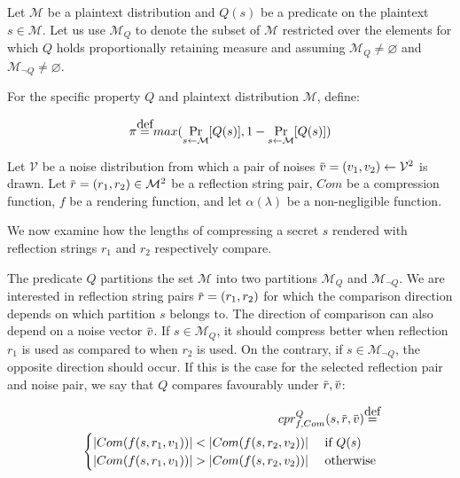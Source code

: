 \documentclass{sig-alternate-05-2015}
\let\emptyset\varnothing
\newcommand\defeq{\stackrel{\mathclap{\normalfont\mbox{def}}}{=}}
\newcommand{\overbar}[1]{\mkern 1.5mu\overline{\mkern-1.5mu#1\mkern-1.5mu}\mkern 1.5mu}
\begin{document}
Let $\mathcal{M}$ be a plaintext distribution and $Q(s)$ be a predicate on the
plaintext $s \in \mathcal{M}$. Let us use $\mathcal{M}_Q$ to denote the subset
of $\mathcal{M}$ restricted over the elements for which $Q$ holds
proportionally retaining measure and assuming $\mathcal{M}_Q \neq \emptyset$
and $\mathcal{M}_{\lnot Q} \neq \emptyset$.

For the specific property $Q$ and plaintext distribution $\mathcal{M}$, define:

\begin{equation*}
    \pi \defeq max(\Pr_{s \leftarrow \mathcal{M}}[Q(s)], 1 - \Pr_{s \leftarrow \mathcal{M}}[Q(s)])
\end{equation*}

Let $\mathcal{V}$ be a noise distribution from which a pair of noises
$\overbar{v} = (v_1, v_2) \leftarrow \mathcal{V}^2$ is drawn.  Let $\overbar{r}
= (r_1, r_2) \in \mathcal{M}^2$ be a reflection string pair, $Com$ be a
compression function, $f$ be a rendering function, and let $\alpha(\lambda)$ be
a non-negligible function.

We now examine how the lengths of compressing a secret $s$ rendered with
reflection strings $r_1$ and $r_2$ respectively compare.

The predicate $Q$ partitions the set $\mathcal{M}$ into two partitions
$\mathcal{M}_Q$ and $\mathcal{M}_{\lnot Q}$. We are interested in reflection
string pairs $\overbar{r} = (r_1, r_2)$ for which the comparison direction
depends on which partition $s$ belongs to.  The direction of comparison can
also depend on a noise vector $\overbar{v}$.  If $s \in \mathcal{M}_Q$, it
should compress better when reflection $r_1$ is used as compared to when $r_2$
is used. On the contrary, if $s \in \mathcal{M}_{\lnot Q}$, the opposite
direction should occur.  If this is the case for the selected reflection pair
and noise pair, we say that $Q$ compares favourably under $\overbar{r},
\overbar{v}$:

\begin{equation*}
\begin{split}
    cpr^Q_{f, Com}(s, \overbar{r}, \overbar{v})
    \defeq\\
    \begin{cases}
        |Com(f(s, r_1, v_1))| < |Com(f(s, r_2, v_2))| &\text{ if } Q(s)\\
        |Com(f(s, r_1, v_1))| > |Com(f(s, r_2, v_2))| &\text{ otherwise}
    \end{cases}
\end{split}
\end{equation*}
\end{document}
